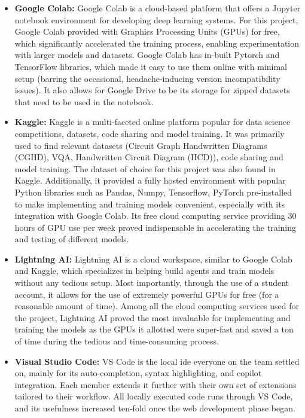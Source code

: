 \begin{itemize}
    \item \textbf{Google Colab:} Google Colab is a cloud-based platform that offers a Jupyter notebook environment for developing deep learning systems. For this project, Google Colab provided with Graphics Processing Units (GPUs) for free, which significantly accelerated the training process, enabling experimentation with larger models and datasets. Google Colab has in-built Pytorch and TensorFlow libraries, which made it easy to use them online with minimal setup (barring the occasional, headache-inducing version incompatibility issues). It also allows for Google Drive to be its storage for zipped datasets that need to be used in the notebook.
    
    \item \textbf{Kaggle:} Kaggle is a multi-faceted online platform popular for data science competitions, datasets, code sharing and model training. It was primarily used to find relevant datasets (Circuit Graph Handwritten Diagrams (CGHD), VQA, Handwritten Circuit Diagram (HCD)), code sharing and model training. The dataset of choice for this project was also found in Kaggle. Additionally, it provided a fully hosted environment with popular Python libraries such as Pandas, Numpy, Tensorflow, PyTorch pre-installed to make implementing and training models convenient, especially with its integration with Google Colab. Its free cloud computing service providing 30 hours of GPU use per week proved indispensable in accelerating the training and testing of different models.
    
    \item \textbf{Lightning AI:} Lightning AI is a cloud workspace, similar to Google Colab and Kaggle, which specializes in helping build agents and train models without any tedious setup. Most importantly, through the use of a student account, it allows for the use of extremely powerful GPUs for free (for a reasonable amount of time). Among all the cloud computing services used for the project, Lightning AI proved the most invaluable for implementing and training the models as the GPUs it allotted were super-fast and saved a ton of time during the tedious and time-consuming process.
    
    \item \textbf{Visual Studio Code:} VS Code is the local \gls{ide} everyone on the team settled on, mainly for its auto-completion, syntax highlighting, and copilot integration. Each member extends it further with their own set of extensions tailored to their workflow. All locally executed code runs through VS Code, and its usefulness increased ten-fold once the web development phase began.
\end{itemize}

